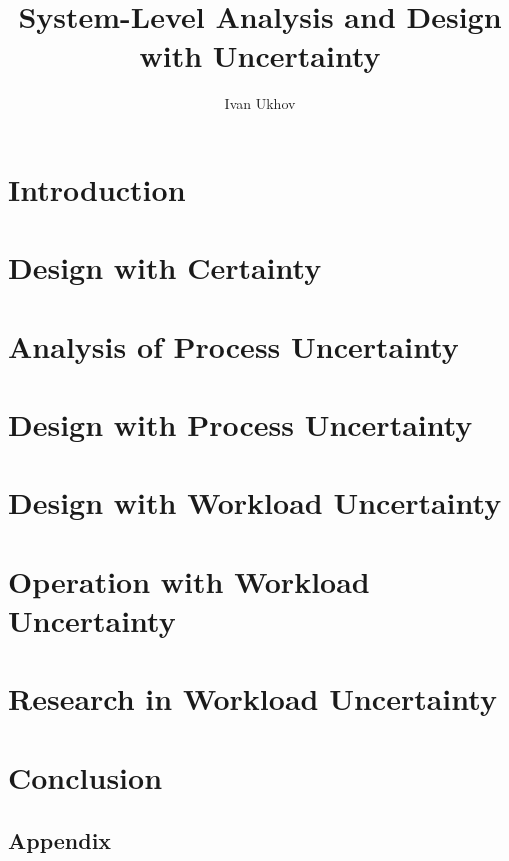\documentclass{thesis}
\title{System-Level Analysis and Design with Uncertainty}
\author{Ivan Ukhov}
\begin{document}
\nocite{ukhov2012, ukhov2014a, ukhov2014b, ukhov2015, ukhov2017}

\chapter{Introduction}
\newcommand{\inputsection}{}


\chapter{Design with Certainty}
\renewcommand{\inputsection}[1]{}


\chapter{Analysis of Process Uncertainty}
\renewcommand{\inputsection}[1]{}


\chapter{Design with Process Uncertainty}
\renewcommand{\inputsection}[1]{}


\chapter{Design with Workload Uncertainty}
\renewcommand{\inputsection}[1]{}


\chapter{Operation with Workload Uncertainty}
\renewcommand{\inputsection}[1]{}


\chapter{Research in Workload Uncertainty}
\renewcommand{\inputsection}[1]{}


\chapter{Conclusion}


\begin{appendices}
\chapter{Appendix}
\renewcommand{\inputsection}[1]{}

\end{appendices}

\printbibliography
\end{document}
